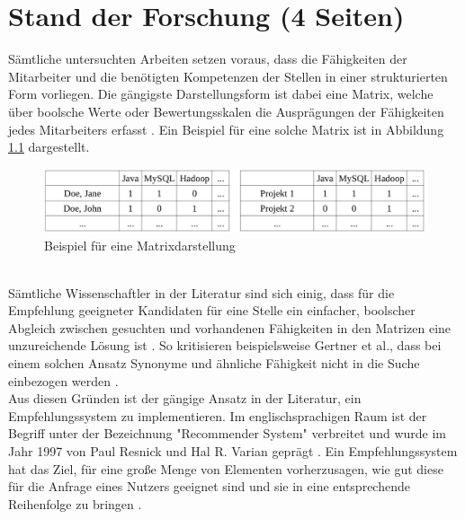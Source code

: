 \chapter{Stand der Forschung (4 Seiten)}
\label{ch:standDerForschung}
Sämtliche untersuchten Arbeiten setzen voraus, dass die Fähigkeiten der Mitarbeiter und die benötigten Kompetenzen der Stellen in einer strukturierten Form vorliegen. Die gängigste Darstellungsform ist dabei eine Matrix, welche über boolsche Werte oder Bewertungsskalen die Ausprägungen der Fähigkeiten jedes Mitarbeiters erfasst \cite[S. 11f.]{recommenderSystems:2016}. Ein Beispiel für eine solche Matrix ist in Abbildung \ref{fig:standDerForschung:abb1} dargestellt.\\
\begin{figure}[h]
	\centering
	\includegraphics[width=1\textwidth]{gfx/Projektmatrix.png}
	\caption{Beispiel für eine Matrixdarstellung}
	\label{fig:standDerForschung:abb1}
\end{figure}
\\
Sämtliche Wissenschaftler in der Literatur sind sich einig, dass für die Empfehlung geeigneter Kandidaten für eine Stelle ein einfacher, boolscher Abgleich zwischen gesuchten und vorhandenen Fähigkeiten in den Matrizen eine unzureichende Lösung ist \cite[S. 2]{prospect:2010}\cite[S. 1]{enhancingERecruitment:2012}\cite[S. 1]{faerber:2003}. So kritisieren beispielsweise Gertner et al., dass bei einem solchen Ansatz Synonyme und ähnliche Fähigkeit nicht in die Suche einbezogen werden \cite[S. 1f.]{mitre:2014}.\\
Aus diesen Gründen ist der gängige Ansatz in der Literatur, ein Empfehlungssystem zu implementieren. Im englischsprachigen Raum ist der Begriff unter der Bezeichnung "Recommender System" verbreitet und wurde im Jahr 1997 von Paul Resnick und Hal R. Varian geprägt \cite{resnick:1997}. Ein Empfehlungssystem hat das Ziel, für eine große Menge von Elementen vorherzusagen, wie gut diese für die Anfrage eines Nutzers geeignet sind und sie in eine entsprechende Reihenfolge zu bringen \cite[S. 3]{recommenderSystems:2016}.



